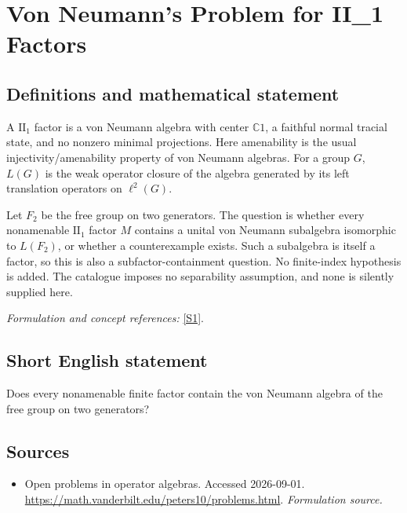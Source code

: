 \documentclass[11pt]{article}
\begin{document}
\section*{\texorpdfstring{Von Neumann's Problem for II\_1 Factors}{Von Neumann's Problem for II\_1 Factors}}\label{30006935}
\subsection{Definitions and mathematical statement}
A $\mathrm{II}_1$ factor is a von Neumann algebra with center ${\mathbb{C}}1$, a faithful normal tracial state, and no nonzero minimal projections. Here amenability is the usual injectivity/amenability property of von Neumann algebras. For a group $G$, $L(G)$ is the weak operator closure of the algebra generated by its left translation operators on $\ell^2(G)$.

Let $F_2$ be the free group on two generators. The question is whether every nonamenable $\mathrm{II}_1$ factor $M$ contains a unital von Neumann subalgebra isomorphic to $L(F_2)$, or whether a counterexample exists. Such a subalgebra is itself a factor, so this is also a subfactor-containment question. No finite-index hypothesis is added. The catalogue imposes no separability assumption, and none is silently supplied here.
\par\smallskip\textit{Formulation and concept references:} \href{https://math.vanderbilt.edu/peters10/problems.html}{[S1]}.

\subsection{Short English statement}
Does every nonamenable finite factor contain the von Neumann algebra of the free group on two generators?
\subsection{Sources}
\begin{itemize}
\item[S1]Open problems in operator algebras. Accessed 2026-09-01.
\url{https://math.vanderbilt.edu/peters10/problems.html}.
\textit{Formulation source.}
\end{itemize}
\end{document}
